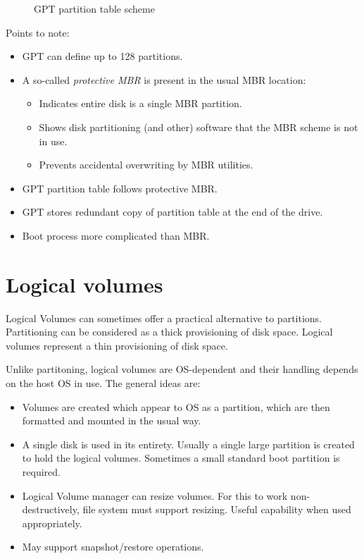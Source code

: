 \begin{figure}
\centering
\caption{GPT partition table scheme}
\end{figure}

Points to note:

\begin{itemize}
\item
  GPT can define up to 128 partitions.
\item
  A so-called \emph{protective MBR} is present in the usual MBR
  location:

  \begin{itemize}
  \item
    Indicates entire disk is a single MBR partition.
  \item
    Shows disk partitioning (and other) software that the MBR scheme is
    not in use.
  \item
    Prevents accidental overwriting by MBR utilities.
  \end{itemize}
\item
  GPT partition table follows protective MBR.
\item
  GPT stores redundant copy of partition table at the end of the drive.
\item
  Boot process more complicated than MBR.
\end{itemize}

\section{Logical volumes}\label{logical-volumes}

Logical Volumes can sometimes offer a practical alternative to
partitions. Partitioning can be considered as a thick provisioning of
disk space. Logical volumes represent a thin provisioning of disk space.

Unlike partitoning, logical volumes are OS-dependent and their handling
depends on the host OS in use. The general ideas are:

\begin{itemize}
\item
  Volumes are created which appear to OS as a partition, which are then
  formatted and mounted in the usual way.
\item
  A single disk is used in its entirety. Usually a single large
  partition is created to hold the logical volumes. Sometimes a small
  standard boot partition is required.
\item
  Logical Volume manager can resize volumes. For this to work
  non-destructively, file system must support resizing. Useful
  capability when used appropriately.
\item
  May support snapshot/restore operations.
\end{itemize}

